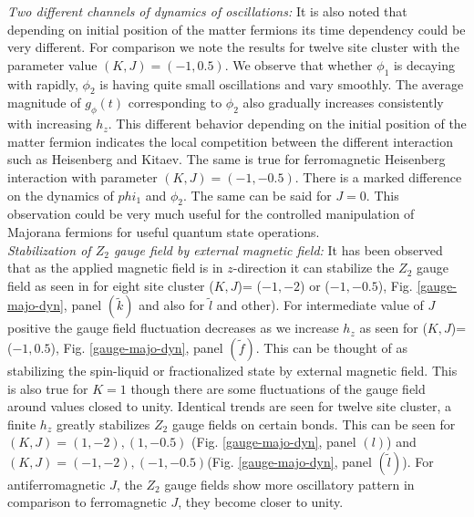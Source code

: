 \documentclass[aps,amsmath,twocolumn,amssymb,floatfix,showpacs,superscriptaddress,nofootinbib,longbibliography]{revtex4-1}
\begin{document}
{\small {\it {Two different channels of dynamics of oscillations:}}}
It is also noted that depending on initial position of the  matter fermions its time dependency could be very different. For comparison we note the results for twelve site cluster with the parameter value $(K,J)= (-1, 0.5)$. We observe that whether $\phi_1$ is decaying with rapidly, $\phi_2$ is having quite small oscillations and vary smoothly. The average magnitude of $g_{\phi}(t)$ corresponding to $\phi_2$ also gradually increases consistently with increasing $h_z$. This different behavior depending on the initial position of the matter fermion indicates
the local competition between the different interaction such as Heisenberg and Kitaev. The same is true for ferromagnetic Heisenberg interaction with parameter $(K,J)=(-1,-0.5)$. There is a marked difference on the dynamics of $phi_1$ and $\phi_2$. The same can be said for $J=0$. This observation could be very much useful for the controlled manipulation of Majorana fermions for useful quantum state operations.\\
\indent
{\small {\it {Stabilization of $Z_2$ gauge field by external magnetic field:}}} It has been observed that as the applied magnetic field is in $z$-direction it can stabilize the $Z_2$ gauge field\cite{khwang-2022} as seen in for eight site cluster  ($K,J$)= ($-1, -2$) or ($-1,-0.5$), Fig. \ref{gauge-majo-dyn}, panel $(\tilde{k})$ and also for $\tilde{l}$ and other). For intermediate value of $J$ positive  the gauge field fluctuation decreases as we increase $h_z$ as seen for ($K,J$)= ($-1, 0.5$), Fig. \ref{gauge-majo-dyn}, panel $(\tilde{f})$. This can be thought of as stabilizing the spin-liquid or fractionalized state by external magnetic field. This is also true for $K=1$ though there are some fluctuations of the gauge field around values closed to unity. Identical trends are seen for twelve site cluster, a finite $h_z$ greatly stabilizes $Z_2$ gauge fields on certain bonds. This can be seen for $(K,J)= (1,-2), (1,-0.5)$ (Fig. \ref{gauge-majo-dyn}, panel $(l)$) and $(K,J)= (-1,-2), (-1,-0.5)$(Fig. \ref{gauge-majo-dyn}, panel $(\tilde{l})$). For antiferromagnetic $J$, the $Z_2$ gauge fields show more oscillatory pattern in comparison to ferromagnetic $J$, they become closer to unity. \\
\end{document}
